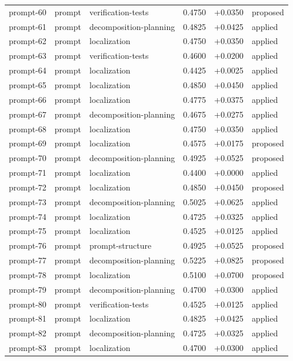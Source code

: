 \begin{center}
\begin{longtable}{llp{5.2cm}rrl}
prompt-60 & prompt & verification-tests & 0.4750 & +0.0350 & proposed \\
prompt-61 & prompt & decomposition-planning & 0.4825 & +0.0425 & applied \\
prompt-62 & prompt & localization & 0.4750 & +0.0350 & applied \\
prompt-63 & prompt & verification-tests & 0.4600 & +0.0200 & applied \\
prompt-64 & prompt & localization & 0.4425 & +0.0025 & applied \\
prompt-65 & prompt & localization & 0.4850 & +0.0450 & applied \\
prompt-66 & prompt & localization & 0.4775 & +0.0375 & applied \\
prompt-67 & prompt & decomposition-planning & 0.4675 & +0.0275 & applied \\
prompt-68 & prompt & localization & 0.4750 & +0.0350 & applied \\
prompt-69 & prompt & localization & 0.4575 & +0.0175 & proposed \\
prompt-70 & prompt & decomposition-planning & 0.4925 & +0.0525 & proposed \\
prompt-71 & prompt & localization & 0.4400 & +0.0000 & applied \\
prompt-72 & prompt & localization & 0.4850 & +0.0450 & proposed \\
prompt-73 & prompt & decomposition-planning & 0.5025 & +0.0625 & applied \\
prompt-74 & prompt & localization & 0.4725 & +0.0325 & applied \\
prompt-75 & prompt & localization & 0.4525 & +0.0125 & applied \\
prompt-76 & prompt & prompt-structure & 0.4925 & +0.0525 & proposed \\
prompt-77 & prompt & decomposition-planning & 0.5225 & +0.0825 & proposed \\
prompt-78 & prompt & localization & 0.5100 & +0.0700 & proposed \\
prompt-79 & prompt & decomposition-planning & 0.4700 & +0.0300 & applied \\
prompt-80 & prompt & verification-tests & 0.4525 & +0.0125 & applied \\
prompt-81 & prompt & localization & 0.4825 & +0.0425 & applied \\
prompt-82 & prompt & decomposition-planning & 0.4725 & +0.0325 & applied \\
prompt-83 & prompt & localization & 0.4700 & +0.0300 & applied \\

\end{longtable}
\end{center}
